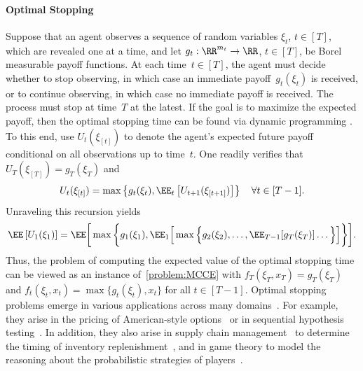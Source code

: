 \documentclass[11pt]{article}
\begin{document}
\paragraph{Optimal Stopping}
\label{sec:application_optimal_stopping} 
Suppose that an agent observes a sequence of random variables $\xi_t$, $t\in[T]$, which are revealed one at a time, and let $g_t: \RR^{m_t}\rightarrow \RR$, $t\in[T]$, be Borel measurable payoff functions. At each time~$t\in[T]$, the agent must decide whether to stop observing, in which case an immediate payoff~$g_t(\xi_t)$ is received, or to continue observing, in which case no immediate payoff is received. The process must stop at time~$T$ at the latest. If the goal is to maximize the expected payoff, then the optimal stopping time can be found via dynamic programming \citep{zhou2022unbiased}. To this end, use $U_t(\xi_{[t]})$ to denote the agent's expected future payoff conditional on all observations up to time~$t$. One readily verifies that $U_T(\xi_{[T]})=g_T(\xi_T)$ and
\begin{align*}
    U_{t}(\xi_{[t]}) = \max \left\{g_t(\xi_{t}), \EE_{t} \left[U_{t+1}(\xi_{[t+1]}) \right]\right\} \quad \forall t\in[T-1].
\end{align*} 
Unraveling this recursion yields
\[
    \EE\left[U_1(\xi_{1})\right]=\EE \bigg[\max\bigg\{g_1(\xi_1), \EE_{1}\Big[\max\Big\{g_2(\xi_2), \ldots, \EE_{T-1}[ g_T(\xi_T)] \ldots  \Big\}   \Big] \bigg\}  \bigg].
\]
Thus, the problem of computing the expected value of the optimal stopping time can be viewed as an instance of~\eqref{problem:MCCE} with $f_T({\xi_T},x_T)=g_T(\xi_T)$ and $f_t(\xi_t,x_t)=\max\{g_t(\xi_t),x_t\} $ for all $t\in[T-1]$. Optimal stopping problems emerge in various applications across many domains~\citep{ciocan2022interpretable}. For example, they arise in the pricing of American-style options~\citep{zhou2022unbiased} or in sequential hypothesis testing~\citep{lai1973optimal}. In addition, they also arise in supply chain management~\citep{van2023intuitive} to determine the timing of inventory replenishment~\citep{ozyoruk2022end}, and in game theory to model the reasoning about the probabilistic strategies of players~\citep{rainforth2018nesting}. 
\end{document}
